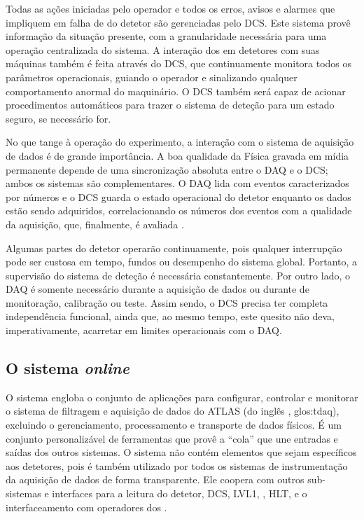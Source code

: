Todas as ações iniciadas pelo operador e todos os erros, avisos e alarmes que
impliquem em falha de  do detetor são gerenciadas pelo DCS. Este
sistema provê informação  da situação presente, com a
granularidade necessária para uma operação centralizada do sistema. A
interação dos  em detetores com suas máquinas também é feita
através do DCS, que continuamente monitora todos os parâmetros operacionais,
guiando o operador e sinalizando qualquer comportamento anormal do
maquinário. O DCS também será capaz de acionar procedimentos automáticos para
trazer o sistema de deteção para um estado seguro, se necessário for.

No que tange à operação do experimento, a interação com o sistema de aquisição
de dados é de grande importância. A boa qualidade da Física gravada em mídia
permanente depende de uma sincronização absoluta entre o DAQ e o DCS; ambos os
sistemas são complementares. O DAQ lida com eventos caracterizados por números
e o DCS guarda o estado operacional do detetor enquanto os dados estão sendo
adquiridos, correlacionando os números dos eventos com a qualidade da
aquisição, que, finalmente, é avaliada .

Algumas partes do detetor operarão continuamente, pois qualquer interrupção
pode ser custosa em tempo, fundos ou desempenho do sistema global. Portanto, a
supervisão do sistema de deteção é necessária constantemente. Por outro lado,
o DAQ é somente necessário durante a aquisição de dados ou durante 
de monitoração, calibração ou teste. Assim sendo, o DCS precisa ter completa
independência funcional, ainda que, ao mesmo tempo, este quesito não deva,
imperativamente, acarretar em limites operacionais com o DAQ.

\subsection{O sistema \textit{online}}
\label{sec:online}

O sistema  engloba o conjunto de aplicações para configurar,
controlar e monitorar o sistema de filtragem e aquisição de dados do ATLAS (do
inglês , \gls{glos:tdaq}), excluindo o
gerenciamento, processamento e transporte de dados físicos. É um conjunto
personalizável de ferramentas que provê a ``cola'' que une entradas e saídas
dos outros sistemas. O sistema  não contém elementos que sejam
específicos aos detetores, pois é também utilizado por todos os sistemas de
instrumentação da aquisição de dados de forma transparente. Ele coopera com
outros sub-sistemas e interfaces para a leitura do detetor, DCS, LVL1,
, HLT,  e o interfaceamento com operadores dos
.

